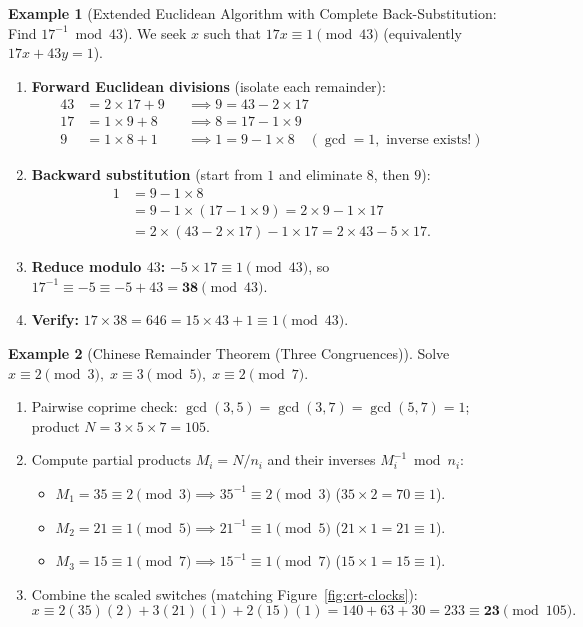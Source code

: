 \documentclass[11pt,a4paper]{article}
\theoremstyle{definition}
\newtheorem{example}{Example}[section]
\begin{document}
\begin{example}[Extended Euclidean Algorithm with Complete Back-Substitution: Find $17^{-1} \bmod 43$]
We seek $x$ such that $17x \equiv 1 \pmod{43}$ (equivalently $17x + 43y = 1$).
\begin{enumerate}
    \item \textbf{Forward Euclidean divisions} (isolate each remainder):
    \begin{align*}
        43 &= 2 \times 17 + 9 &&\implies 9 = 43 - 2 \times 17 \\
        17 &= 1 \times 9 + 8  &&\implies 8 = 17 - 1 \times 9 \\
        9  &= 1 \times 8 + 1  &&\implies 1 = 9 - 1 \times 8 \quad (\gcd = 1,\text{ inverse exists!})
    \end{align*}
    \item \textbf{Backward substitution} (start from $1$ and eliminate $8$, then $9$):
    \begin{align*}
        1 &= 9 - 1 \times 8 \\
          &= 9 - 1 \times (17 - 1 \times 9) = 2 \times 9 - 1 \times 17 \\
          &= 2 \times (43 - 2 \times 17) - 1 \times 17 = 2 \times 43 - 5 \times 17.
    \end{align*}
    \item \textbf{Reduce modulo $43$:} $-5 \times 17 \equiv 1 \pmod{43}$, so $17^{-1} \equiv -5 \equiv -5 + 43 = \mathbf{38} \pmod{43}$.
    \item \textbf{Verify:} $17 \times 38 = 646 = 15 \times 43 + 1 \equiv 1 \pmod{43}$.
\end{enumerate}
\end{example}

\begin{example}[Chinese Remainder Theorem (Three Congruences)]
Solve $x \equiv 2 \pmod 3,\; x \equiv 3 \pmod 5,\; x \equiv 2 \pmod 7$.
\begin{enumerate}
    \item Pairwise coprime check: $\gcd(3, 5) = \gcd(3, 7) = \gcd(5, 7) = 1$; product $N = 3 \times 5 \times 7 = 105$.
    \item Compute partial products $M_i = N / n_i$ and their inverses $M_i^{-1} \bmod n_i$:
    \begin{itemize}
        \item $M_1 = 35 \equiv 2 \pmod 3 \implies 35^{-1} \equiv 2 \pmod 3$ ($35 \times 2 = 70 \equiv 1$).
        \item $M_2 = 21 \equiv 1 \pmod 5 \implies 21^{-1} \equiv 1 \pmod 5$ ($21 \times 1 = 21 \equiv 1$).
        \item $M_3 = 15 \equiv 1 \pmod 7 \implies 15^{-1} \equiv 1 \pmod 7$ ($15 \times 1 = 15 \equiv 1$).
    \end{itemize}
    \item Combine the scaled switches (matching Figure~\ref{fig:crt-clocks}):
    \[
        x \equiv 2(35)(2) + 3(21)(1) + 2(15)(1) = 140 + 63 + 30 = 233 \equiv \mathbf{23} \pmod{105}.
    \]
\end{enumerate}
\end{example}
\end{document}
